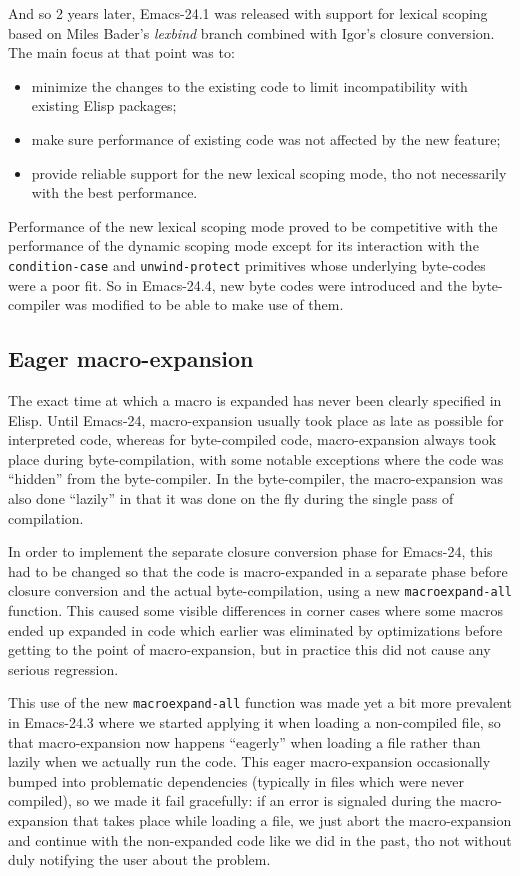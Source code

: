 \documentclass[format=acmsmall, review=false, screen=true]{acmart}
\newcommand \Elisp {Elisp}
\begin{document}
And so 2 years later, Emacs-24.1 was released with support for lexical
scoping based on Miles Bader's \emph{lexbind} branch combined with Igor's
closure conversion.  The main focus at that point was to:
\begin{itemize}
\item minimize the changes to the existing code to limit incompatibility
  with existing \Elisp{} packages;
\item make sure performance of existing code was not affected by the
  new feature;
\item provide reliable support for the new lexical scoping mode, tho not
  necessarily with the best performance.
\end{itemize}

Performance of the new lexical scoping mode proved to be competitive
with the performance of the dynamic scoping mode except for its interaction
with the \texttt{condition-case} and \texttt{unwind-protect} primitives
whose underlying byte-codes were a poor fit.  So in Emacs-24.4, new byte
codes were introduced and the byte-compiler was modified to be able to make
use of them.

\subsection{Eager macro-expansion} %

The exact time at which a macro is expanded has never been clearly specified
in \Elisp{}.  Until Emacs-24, macro-expansion usually took place as late as
possible for interpreted code, whereas for byte-compiled code,
macro-expansion always took place during byte-compilation, with some notable
exceptions where the code was ``hidden'' from the byte-compiler.  In the
byte-compiler, the macro-expansion was also done ``lazily'' in that it was
done on the fly during the single pass of compilation.

In order to implement the separate closure conversion phase for Emacs-24,
this had to be changed so that the code is macro-expanded in a separate
phase before closure conversion and the actual byte-compilation, using a new
\texttt{macroexpand-all} function.
This caused some visible differences in corner cases where some macros ended
up expanded in code which earlier was eliminated by optimizations before
getting to the point of macro-expansion, but in practice this did not cause
any serious regression.

This use of the new \texttt{macroexpand-all} function was made yet a bit
more prevalent in Emacs-24.3 where we started applying it when loading
a non-compiled file, so that macro-expansion now happens ``eagerly'' when
loading a file rather than lazily when we actually run the code.  This eager
macro-expansion occasionally bumped into problematic dependencies (typically
in files which were never compiled), so we made it fail gracefully: if an
error is signaled during the macro-expansion that takes place while loading
a file, we just abort the macro-expansion and continue with the non-expanded
code like we did in the past, tho not without duly notifying the user about
the problem.
\end{document}
